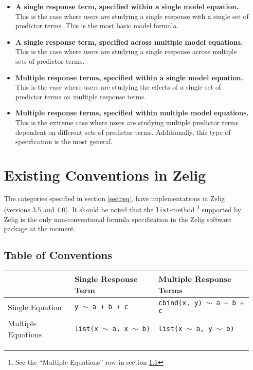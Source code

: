\documentclass{article}
\newcommand{\tweedly}[0]{$\sim${ }}
\begin{document}
\begin{itemize}

  \item {\bf A single response term, specified within a single model equation.}
    This is the case where users are studying a single response with a single
    set of predictor terms. This is the most basic model formula.

  \item {\bf A single response term, specified across multiple model equations.}
    This is the case where users are studying a single response across multiple
    sets of predictor terms.

  \item {\bf Multiple response terms, specified within a single model equation.}
    This is the case where users are studying the effects of a single set of
    predictor terms on multiple response terms.

  \item {\bf Multiple response terms, specified within multiple model equations.}
    This is the extreme case where users are studying multiple predictor terms
    dependent on different sets of predictor terms. Additionally, this type of
    specification is the most general.

\end{itemize}



%
%
%
\section{Existing Conventions in Zelig}
\label{sec:existing-zelig}

The categories specified in section \ref{sec:req}, have implementations in
Zelig (versions 3.5 and 4.0). It should be noted that the {\tt list}-method
\footnote{See the ``Multiple Equations'' row in section
\ref{subsec:table-conventions}} supported by Zelig is the only non-conventional
formula specification in the Zelig software package at the moment.


\subsection{Table of Conventions}
\label{subsec:table-conventions}

{\noindent}\begin{tabular}{|l|l|l|}

  \hline

  & Single Response Term & Multiple Response Terms \\ \hline

  Single Equation &
  {\tt y \tweedly a + b + c} & {\tt cbind(x, y) \tweedly a + b + c}
  \\ \hline

  Multiple Equations & 
  {\tt list(x \tweedly a, x \tweedly b)} &
  {\tt list(x \tweedly a, y \tweedly b)} \\ \hline


\end{tabular}
\end{document}
